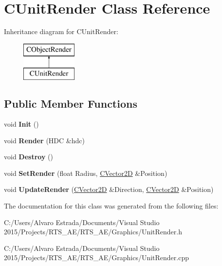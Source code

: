 \hypertarget{class_c_unit_render}{}\section{C\+Unit\+Render Class Reference}
\label{class_c_unit_render}
Inheritance diagram for C\+Unit\+Render\+:\begin{figure}[H]
\begin{center}
\leavevmode
\includegraphics[height=2.000000cm]{class_c_unit_render}
\end{center}
\end{figure}
\subsection*{Public Member Functions}
\begin{DoxyCompactItemize}
\item 
void {\bfseries Init} ()\hypertarget{class_c_unit_render_ab95a70b01884c12c56e5af3e08031048}{}\label{class_c_unit_render_ab95a70b01884c12c56e5af3e08031048}

\item 
void {\bfseries Render} (H\+DC \&hdc)\hypertarget{class_c_unit_render_afec3ca57514c67b746ed3a4f1ed600a3}{}\label{class_c_unit_render_afec3ca57514c67b746ed3a4f1ed600a3}

\item 
void {\bfseries Destroy} ()\hypertarget{class_c_unit_render_ab3ee76537438055c7a4eaaea708d0716}{}\label{class_c_unit_render_ab3ee76537438055c7a4eaaea708d0716}

\item 
void {\bfseries Set\+Render} (float Radius, \hyperlink{struct_c_vector2_d}{C\+Vector2D} \&Position)\hypertarget{class_c_unit_render_ae19b36e2c765000707d62162f0ed27b5}{}\label{class_c_unit_render_ae19b36e2c765000707d62162f0ed27b5}

\item 
void {\bfseries Update\+Render} (\hyperlink{struct_c_vector2_d}{C\+Vector2D} \&Direction, \hyperlink{struct_c_vector2_d}{C\+Vector2D} \&Position)\hypertarget{class_c_unit_render_a47eed0f257a990f0254e217084d48e31}{}\label{class_c_unit_render_a47eed0f257a990f0254e217084d48e31}

\end{DoxyCompactItemize}


The documentation for this class was generated from the following files\+:\begin{DoxyCompactItemize}
\item 
C\+:/\+Users/\+Alvaro Estrada/\+Documents/\+Visual Studio 2015/\+Projects/\+R\+T\+S\+\_\+\+A\+E/\+R\+T\+S\+\_\+\+A\+E/\+Graphics/Unit\+Render.\+h\item 
C\+:/\+Users/\+Alvaro Estrada/\+Documents/\+Visual Studio 2015/\+Projects/\+R\+T\+S\+\_\+\+A\+E/\+R\+T\+S\+\_\+\+A\+E/\+Graphics/Unit\+Render.\+cpp\end{DoxyCompactItemize}
